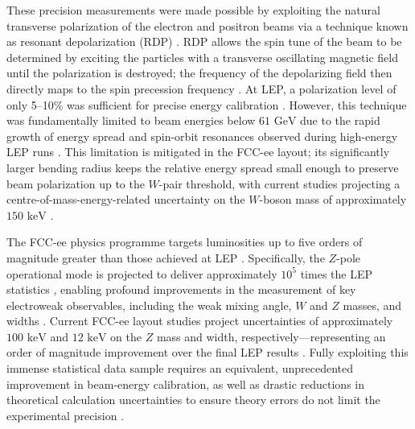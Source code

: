 \documentclass[%
 aip,
 amsmath,amssymb,
 reprint,%
superscriptaddress
]{revtex4-2}
\begin{document}
These precision measurements were made possible by exploiting the natural transverse polarization of the electron and positron beams via a technique known as resonant depolarization (RDP) \cite{benedikt_future_2025}. RDP allows the spin tune of the beam to be determined by exciting the particles with a transverse oscillating magnetic field until the polarization is destroyed; the frequency of the depolarizing field then directly maps to the spin precession frequency \cite{benedikt_future_2025,blondel_polarization_2019}. At LEP, a polarization level of only 5–10\% was sufficient for precise energy calibration \cite{blondel_polarization_2019}. However, this technique was fundamentally limited to beam energies below $61\text{ GeV}$ due to the rapid growth of energy spread and spin-orbit resonances observed during high-energy LEP runs \cite{blondel_polarization_2019,koratzinos_fcc-ee_2016,assmann_spin_2001}. This limitation is mitigated in the FCC-ee layout; its significantly larger bending radius keeps the relative energy spread small enough to preserve beam polarization up to the $W$-pair threshold, with current studies projecting a centre-of-mass-energy-related uncertainty on the $W$-boson mass of approximately $150\text{ keV}$ \cite{keintzel:ipac2026-mop1037}.

The FCC-ee physics programme targets luminosities up to five orders of magnitude greater than those achieved at LEP \cite{Dam2025DetectorRequirements}. Specifically, the $Z$-pole operational mode is projected to deliver approximately $10^5$ times the LEP statistics \cite{koratzinos_fcc-ee_2016}, enabling profound improvements in the measurement of key electroweak observables, including the weak mixing angle, $W$ and $Z$ masses, and widths \cite{Dam2025DetectorRequirements, denterria_physics_2016}. Current FCC-ee layout studies project uncertainties of approximately $100\text{ keV}$ and $12\text{ keV}$ on the $Z$ mass and width, respectively—representing an order of magnitude improvement over the final LEP results \cite{benedikt_future_2025, maestre_z_2021}. Fully exploiting this immense statistical data sample requires an equivalent, unprecedented improvement in beam-energy calibration, as well as drastic reductions in theoretical calculation uncertainties to ensure theory errors do not limit the experimental precision \cite{blondel_theory_2019}.
\end{document}
